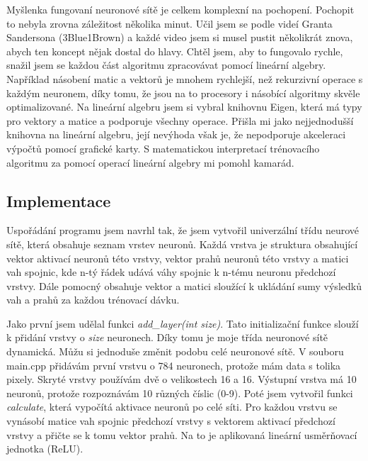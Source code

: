 \documentclass[a4paper,11pt, oneside]{book} \usepackage[czech]{babel}
\begin{document}
	Myšlenka fungovaní neuronové sítě je celkem komplexní na pochopení. Pochopit to
	nebyla zrovna záležitost několika minut. Učil jsem se podle videí Granta
	Sandersona (3Blue1Brown) a každé video jsem si musel pustit několikrát znova,
	abych ten koncept nějak dostal do hlavy. Chtěl jsem, aby to fungovalo rychle,
	snažil jsem se každou část algoritmu zpracovávat pomocí lineární algebry.
	Například násobení matic a vektorů je mnohem rychlejší, než rekurzivní operace s
	každým neuronem, díky tomu, že jsou na to procesory i násobící algoritmy skvěle
	optimalizované. Na lineární algebru jsem si vybral knihovnu Eigen, která má
	typy pro vektory a matice a podporuje všechny operace. Přišla mi jako
	nejjednodušší knihovna na lineární algebru, její nevýhoda však je, že
	nepodporuje akceleraci výpočtů pomocí grafické karty. S matematickou
	interpretací trénovacího algoritmu za pomocí operací lineární algebry mi pomohl
	kamarád.

	\subsection{Implementace}
	Uspořádání programu jsem navrhl tak, že jsem vytvořil univerzální třídu neurové sítě,
	která obsahuje seznam vrstev neuronů. Každá vrstva je struktura obsahující
	vektor aktivací neuronů této vrstvy, vektor prahů neuronů této vrstvy a matici vah spojnic,
	kde n-tý řádek udává váhy spojnic k n-tému neuronu předchozí vrstvy. Dále pomocný obsahuje
	vektor a matici sloužící k ukládání sumy výsledků vah a prahů za každou trénovací dávku.

	Jako první jsem udělal funkci \textit{add\_layer(int size)}. Tato initializační funkce slouží k
	přidání vrstvy o \textit{size} neuronech. Díky tomu je moje třída neuronové sítě dynamická.
	Můžu si jednoduše změnit podobu celé neuronové sítě. V souboru main.cpp přidávám první
	vrstvu o 784 neuronech, protože mám data s tolika pixely. Skryté vrstvy používám dvě o velikostech
	16 a 16. Výstupní vrstva má 10 neuronů, protože rozpoznávám 10 různých číslic (0-9).
	Poté jsem vytvořil funkci \textit{calculate}, která vypočítá aktivace neuronů po celé síti. Pro
	každou vrstvu se vynásobí matice vah spojnic předchozí vrstvy s vektorem aktivací předchozí vrstvy
	a přičte se k tomu vektor prahů. Na to je aplikovaná lineární usměrňovací jednotka (ReLU).
\end{document}
